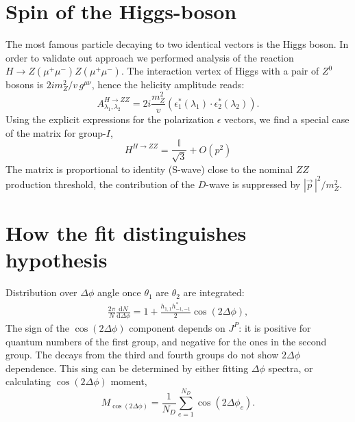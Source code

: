 \documentclass[prd,preprintnumbers,floatfix,
nofootinbib,superscriptaddress]{revtex4}
\newcommand{\diff}{\mathrm{d}}
\newcommand{\I}{\ensuremath{I}}
\begin{document}
\section{Spin of the Higgs-boson}
The most famous particle decaying to two identical vectors is the Higgs boson.
In order to validate out approach we performed analysis of the reaction $H\to Z(\mu^+\mu^-)Z(\mu^+\mu^-)$.
The interaction vertex of Higgs with a pair of $Z^0$ bosons is $2i m_Z^2/v\,g^{\mu\nu}$,
hence the helicity amplitude reads:
\begin{equation} \label{eq:HZZ}
  A^{H\to ZZ}_{\lambda_1,\lambda_2} = 2i\frac{m_Z^2}{v} (\epsilon_1^*(\lambda_1)\cdot\epsilon_2^*(\lambda_2)).
\end{equation}
Using the explicit expressions for the polarization $\epsilon$ vectors,
we find a special case of the matrix for group-$\I$,
\begin{equation}
  H^{H\to ZZ} = \frac{\mathbb{I}}{\sqrt{3}} + O(p^2)
\end{equation}
The matrix is proportional to identity (S-wave) close to the nominal $ZZ$ production threshold,
the contribution of the $D$-wave is suppressed by $|\vec p\,|^2/m_Z^2$.


\section{How the fit distinguishes hypothesis}

Distribution over $\Delta\phi$ angle once $\theta_1$ are $\theta_2$ are integrated:
\begin{align}
  \frac{2\pi}{N}\frac{\diff N}{\diff \Delta\phi} = 1
   + \frac{h_{1,1} h_{-1,-1}^*}{2} \cos(2 \Delta\phi),
\end{align}
The sign of the $\cos(2\Delta\phi)$ component depends on $J^P$: it is positive for quantum numbers of the first group, and negative for the ones in the second group.
The decays from the third and fourth groups do not show $2\Delta\phi$ dependence.
This sing can be determined by either fitting $\Delta\phi$ spectra, or calculating $\cos(2\Delta\phi)$ moment,
\begin{equation}
  M_{\cos(2\Delta\phi)} = \frac{1}{N_D}\sum_{e=1}^{N_D} \cos(2\Delta\phi_e).
\end{equation}
\end{document}

